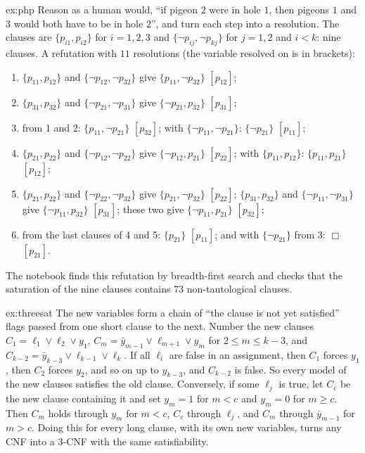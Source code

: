 \begin{solution}{ex:php}
\idea Reason as a human would, ``if pigeon $2$ were in hole $1$, then pigeons $1$ and $3$ would both have to be in hole $2$'', and turn each
step into a resolution.
\writeup The clauses are $\{p_{i1},p_{i2}\}$ for $i=1,2,3$ and $\{\neg p_{ij},\neg p_{kj}\}$ for $j=1,2$ and $i<k$: nine clauses. A refutation
with $11$ resolutions (the variable resolved on is in brackets):
\begin{enumerate}
\item $\{p_{11},p_{12}\}$ and $\{\neg p_{12},\neg p_{32}\}$ give $\{p_{11},\neg p_{32}\}$ $[p_{12}]$;
\item $\{p_{31},p_{32}\}$ and $\{\neg p_{21},\neg p_{31}\}$ give $\{\neg p_{21},p_{32}\}$ $[p_{31}]$;
\item from 1 and 2: $\{p_{11},\neg p_{21}\}$ $[p_{32}]$; with $\{\neg p_{11},\neg p_{21}\}$: $\{\neg p_{21}\}$ $[p_{11}]$;
\item $\{p_{21},p_{22}\}$ and $\{\neg p_{12},\neg p_{22}\}$ give $\{\neg p_{12},p_{21}\}$ $[p_{22}]$; with $\{p_{11},p_{12}\}$: $\{p_{11},p_{21}\}$ $[p_{12}]$;
\item $\{p_{21},p_{22}\}$ and $\{\neg p_{22},\neg p_{32}\}$ give $\{p_{21},\neg p_{32}\}$ $[p_{22}]$; $\{p_{31},p_{32}\}$ and $\{\neg p_{11},\neg p_{31}\}$ give $\{\neg p_{11},p_{32}\}$ $[p_{31}]$;
these two give $\{\neg p_{11},p_{21}\}$ $[p_{32}]$;
\item from the last clauses of 4 and 5: $\{p_{21}\}$ $[p_{11}]$; and with $\{\neg p_{21}\}$ from 3: $\Box$ $[p_{21}]$.
\end{enumerate}
The notebook finds this refutation by breadth-first search and checks that the saturation of the nine clauses
contains $73$ non-tautological clauses.
\end{solution}

\begin{solution}{ex:threesat}
\idea The new variables form a chain of ``the clause is not yet satisfied'' flags passed from one short clause to the next.
\writeup Number the new clauses $C_1=\ell_1\lor\ell_2\lor y_1$, $C_m=\bar y_{m-1}\lor\ell_{m+1}\lor y_m$ for $2\le m\le k-3$, and $C_{k-2}=\bar y_{k-3}\lor\ell_{k-1}\lor\ell_k$. If all $\ell_i$
are false in an assignment, then $C_1$ forces $y_1$, then $C_2$ forces $y_2$, and so on up to $y_{k-3}$, and $C_{k-2}$ is false. So every model of the
new clauses satisfies the old clause. Conversely, if some $\ell_j$ is true, let $C_c$ be the new clause containing it and set
$y_m=1$ for $m<c$ and $y_m=0$ for $m\ge c$. Then $C_m$ holds through $y_m$ for $m<c$, $C_c$ through $\ell_j$, and $C_m$ through $\bar y_{m-1}$ for $m>c$.
Doing this for every long clause, with its own new variables, turns any CNF into a $3$-CNF with the same satisfiability.
\end{solution}

